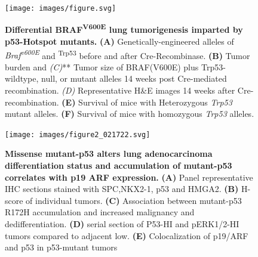 \begin{figure}
\hypertarget{fig:11}{%
\centering
\texttt{[image: images/figure.svg]}
\caption{\textbf{Differential BRAF\textsuperscript{V600E} lung tumorigenesis imparted by p53-Hotspot mutants.} \textbf{(A)} Genetically-engineered alleles of \emph{Braf\textsuperscript{v600E}} and \textsuperscript{Trp53} before and after Cre-Recombinase. \textbf{(B)} Tumor burden and \emph{(C)}** Tumor size of BRAF(V600E) plus Trp53-wildtype, null, or mutant alleles 14 weeks post Cre-mediated recombination. \emph{(D)} Representative H\&E images 14 weeks after Cre-recombination. \textbf{(E)} Survival of mice with Heterozygous \emph{Trp53} mutant alleles. \textbf{(F)} Survival of mice with homozygous \emph{Trp53} alleles.}\label{fig:11}
}
\end{figure}

\begin{figure}
\hypertarget{fig:12}{%
\centering
\texttt{[image: images/figure2\_021722.svg]}
\caption{\textbf{Missense mutant-p53 alters lung adenocarcinoma differentiation status and accumulation of mutant-p53 correlates with p19 ARF expression.} \textbf{(A)} Panel representative IHC sections stained with SPC,NKX2-1, p53 and HMGA2. \textbf{(B)} H-score of individual tumors. \textbf{(C)} Association between mutant-p53 R172H accumulation and increased malignancy and dedifferentiation. \textbf{(D)} serial section of P53-HI and pERK1/2-HI tumors compared to adjacent low. \textbf{(E)} Colocalization of p19/ARF and p53 in p53-mutant tumors}\label{fig:12}
}
\end{figure}

